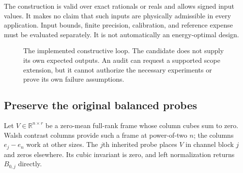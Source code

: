 \documentclass[11pt,letterpaper]{article}
\newcommand{\R}{\mathbb R}\newcommand{\V}{\mathcal V}\newcommand{\N}{\mathcal N}
\theoremstyle{remark}\newtheorem{remark}{Remark}[section]
\begin{document}
The construction is valid over exact rationals or reals and allows signed input values. It makes no claim that such inputs are physically admissible in every application. Input bounds, finite precision, calibration, and reference expense must be evaluated separately. It is not automatically an energy-optimal design.

\begin{figure}[htbp]\centering
{}
\caption{The implemented constructive loop. The candidate does not supply its own expected outputs. An audit can request a supported scope extension, but it cannot authorize the necessary experiments or prove its own failure assumptions.}\label{fig:loop}
\end{figure}

\subsection{Preserve the original balanced probes}
Let $V\in\R^{n\times r}$ be a zero-mean full-rank frame whose column cubes sum to zero. Walsh contrast columns provide such a frame at power-of-two $n$; the columns $e_j-e_n$ work at other sizes. The $j$th inherited probe places $V$ in channel block $j$ and zeros elsewhere. Its cubic invariant is zero, and left normalization returns $B_{0,j}$ directly.
\end{document}
